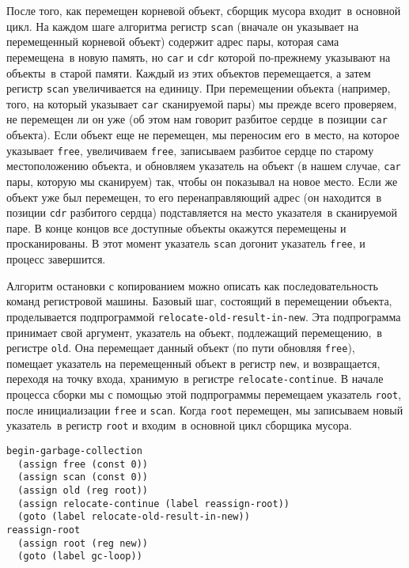 После того, как перемещен корневой объект, сборщик мусора
входит~в основной цикл. На каждом шаге алгоритма регистр
{\tt scan} (вначале он указывает на перемещенный корневой
объект) содержит адрес пары, которая сама перемещена~в новую память, но
{\tt car} и {\tt cdr} которой по-прежнему указывают на
объекты~в старой памяти.  Каждый из этих объектов перемещается, а
затем регистр {\tt scan} увеличивается на единицу.  При
перемещении объекта (например, того, на который указывает
{\tt car} сканируемой пары) мы прежде всего проверяем, не
перемещен ли он уже (об этом нам говорит разбитое сердце~в позиции
{\tt car} объекта).  Если объект еще не перемещен, мы переносим
его~в место, на которое указывает {\tt free}, увеличиваем
{\tt free}, записываем разбитое сердце по старому
местоположению объекта, и обновляем указатель на объект (в нашем
случае, {\tt car} пары, которую мы сканируем) так, чтобы он
показывал на новое место.  Если же объект уже был перемещен, то его
перенаправляющий адрес (он находится~в позиции {\tt cdr}
разбитого сердца) подставляется на место указателя~в сканируемой
паре.  В конце концов все доступные объекты окажутся перемещены и
просканированы.  В этот момент указатель {\tt scan} догонит
указатель {\tt free}, и процесс завершится.

Алгоритм остановки с копированием можно описать как
последовательность команд регистровой машины.  Базовый шаг, состоящий
в перемещении объекта, проделывается подпрограммой
{\tt relocate-old-result-in-new}.  Эта подпрограмма принимает
свой аргумент, указатель на объект, подлежащий перемещению,~в регистре
{\tt old}.
Она перемещает данный объект (по пути обновляя
{\tt free}), помещает указатель на перемещенный объект в
регистр {\tt new}, 
и возвращается, переходя на точку
входа, хранимую~в регистре {\tt relocate-continue}.  В начале
процесса сборки мы с помощью этой подпрограммы перемещаем указатель
{\tt root}, после инициализации {\tt free} и
{\tt scan}. Когда {\tt root} перемещен, мы записываем
новый указатель~в регистр {\tt root} и входим~в основной цикл
сборщика мусора.

\begin{Verbatim}[fontsize=\small]
begin-garbage-collection
  (assign free (const 0))
  (assign scan (const 0))
  (assign old (reg root))
  (assign relocate-continue (label reassign-root))
  (goto (label relocate-old-result-in-new))
reassign-root
  (assign root (reg new))
  (goto (label gc-loop))
\end{Verbatim}

